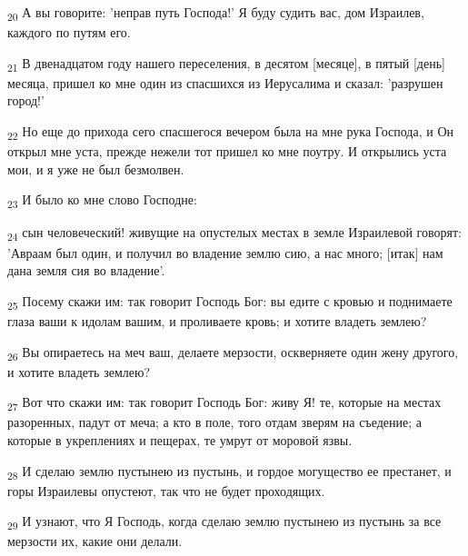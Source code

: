 \begin{tcolorbox}
\textsubscript{20} А вы говорите: 'неправ путь Господа!' Я буду судить вас, дом Израилев, каждого по путям его.
\end{tcolorbox}
\begin{tcolorbox}
\textsubscript{21} В двенадцатом году нашего переселения, в десятом [месяце], в пятый [день] месяца, пришел ко мне один из спасшихся из Иерусалима и сказал: 'разрушен город!'
\end{tcolorbox}
\begin{tcolorbox}
\textsubscript{22} Но еще до прихода сего спасшегося вечером была на мне рука Господа, и Он открыл мне уста, прежде нежели тот пришел ко мне поутру. И открылись уста мои, и я уже не был безмолвен.
\end{tcolorbox}
\begin{tcolorbox}
\textsubscript{23} И было ко мне слово Господне:
\end{tcolorbox}
\begin{tcolorbox}
\textsubscript{24} сын человеческий! живущие на опустелых местах в земле Израилевой говорят: 'Авраам был один, и получил во владение землю сию, а нас много; [итак] нам дана земля сия во владение'.
\end{tcolorbox}
\begin{tcolorbox}
\textsubscript{25} Посему скажи им: так говорит Господь Бог: вы едите с кровью и поднимаете глаза ваши к идолам вашим, и проливаете кровь; и хотите владеть землею?
\end{tcolorbox}
\begin{tcolorbox}
\textsubscript{26} Вы опираетесь на меч ваш, делаете мерзости, оскверняете один жену другого, и хотите владеть землею?
\end{tcolorbox}
\begin{tcolorbox}
\textsubscript{27} Вот что скажи им: так говорит Господь Бог: живу Я! те, которые на местах разоренных, падут от меча; а кто в поле, того отдам зверям на съедение; а которые в укреплениях и пещерах, те умрут от моровой язвы.
\end{tcolorbox}
\begin{tcolorbox}
\textsubscript{28} И сделаю землю пустынею из пустынь, и гордое могущество ее престанет, и горы Израилевы опустеют, так что не будет проходящих.
\end{tcolorbox}
\begin{tcolorbox}
\textsubscript{29} И узнают, что Я Господь, когда сделаю землю пустынею из пустынь за все мерзости их, какие они делали.
\end{tcolorbox}
